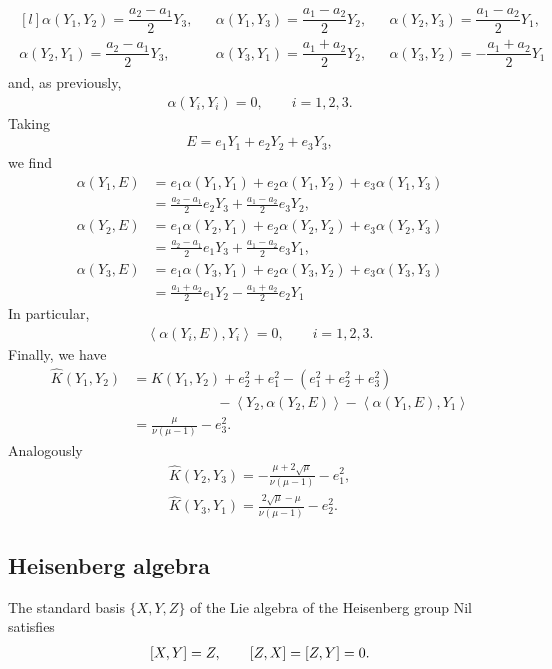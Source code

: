 \documentclass[12pt]{article}
\begin{document}
\begin{align*}
    \begin{matrix*}[l]
      \alpha(Y_1,Y_2)=\dfrac{a_2-a_1}{2}Y_3, && \alpha(Y_1,Y_3)=\dfrac{a_1-a_2}{2}Y_2, && \alpha(Y_2,Y_3)=\dfrac{a_1-a_2}{2}Y_1, 
       \\[1em]
       \alpha(Y_2,Y_1)=\dfrac{a_2-a_1}{2}Y_3,&&
      \alpha(Y_3,Y_1)= \dfrac{a_1+a_2}{2}Y_2, && \alpha(Y_3,Y_2)=-\dfrac{a_1+a_2}{2}Y_1
    \end{matrix*}
\end{align*}
and, as previously,
\begin{align*}
    \alpha(Y_i,Y_i)=0,\qquad i=1,2,3.
\end{align*}
Taking
\begin{align*}
    E=e_1Y_1+e_2Y_2+e_3Y_3,
\end{align*}
 we find
\begin{align*}
      \alpha(Y_1,E)
    &=e_1\alpha(Y_1,Y_1)+ e_2\alpha(Y_1,Y_2)+ e_3\alpha(Y_1,Y_3) \\
    &=\frac{a_2-a_1}{2}e_2Y_3+\frac{a_1-a_2}{2}e_3Y_2, \\[1em]
    \alpha(Y_2,E)
    &=e_1\alpha(Y_2,Y_1)+ e_2\alpha(Y_2,Y_2)+ e_3\alpha(Y_2,Y_3) \\
    &=\frac{a_2-a_1}{2}e_1Y_3+\frac{a_1-a_2}{2}e_3Y_1, \\[1em]
    \alpha(Y_3,E)
    &=e_1\alpha(Y_3,Y_1)+ e_2\alpha(Y_3,Y_2)+ e_3\alpha(Y_3,Y_3) \\
    &=\frac{a_1+a_2}{2}e_1Y_2-\frac{a_1+a_2}{2}e_2Y_1
\end{align*}
In particular,
\begin{align*}
    \left\langle \alpha(Y_i,E),Y_i \right\rangle=0,
    \qquad i=1,2,3.
\end{align*}
Finally, we have
\begin{align*}
    \nonumber \widehat{K}(Y_1,Y_2)
    &=K(Y_1,Y_2)+e_2^2+e_1^2-(e_1^2+e_2^2+e_3^2) \\
    &\qquad \qquad \qquad -\left\langle Y_2,\alpha(Y_2,E) \right\rangle
    -\left\langle \alpha(Y_1,E),Y_1 \right\rangle \\
    &=\frac{\mu}{\nu(\mu-1)}-e_3^2.
\end{align*}
Analogously
\begin{align*}
    \widehat{K}(Y_2,Y_3) =-\frac{\mu+2\sqrt{\mu}}{\nu(\mu-1)}-e_1^2, \\[1em]
    \widehat{K}(Y_3,Y_1) =\frac{2\sqrt{\mu}-\mu}{\nu(\mu-1)}-e_2^2.
\end{align*}
\subsection{Heisenberg algebra}
\noindent The standard basis $\{X,Y,Z\}$ of the Lie algebra of the Heisenberg group $\mathrm{Nil}$ satisfies
\begin{align*}
\noindent [X,Y]=Z,
\qquad
[Z,X]=[Z,Y]=0.
\end{align*}
\end{document}
